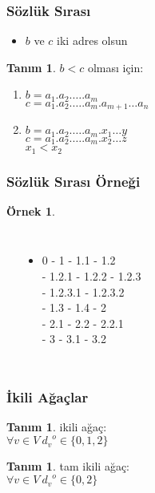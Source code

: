 \documentclass[dvipsnames]{beamer}
\theoremstyle{definition}
\newtheorem{tanim}[theorem]{Tanım}
\theoremstyle{example}
\newtheorem{ornek}[theorem]{Örnek}
\theoremstyle{plain}
\begin{document}
\begin{frame}
  \frametitle{Sözlük Sırası}

  \begin{itemize}
    \item $b$ ve $c$ iki adres olsun
  \end{itemize}

  \begin{tanim}
    \alert{$b < c$} olması için:
    \begin{enumerate}
      \item $b=a_1.a_2. \dots .a_m$\\
        $c=a_1.a_2. \dots .a_m.a_{m+1} \dots a_n$
      \pause
      \item $b=a_1.a_2. \dots .a_m.x_1 \dots y$\\
        $c=a_1.a_2. \dots .a_m.x_2 \dots z$\\
        $x_1 < x_2$
    \end{enumerate}
  \end{tanim}
\end{frame}

\begin{frame}
  \frametitle{Sözlük Sırası Örneği}

  \begin{ornek}
    \begin{columns}
      \begin{center}
      \end{center}

      \pause
      \begin{itemize}
        \item 0 - 1 - 1.1 - 1.2\\
          - 1.2.1 - 1.2.2 - 1.2.3\\
          - 1.2.3.1 - 1.2.3.2\\
          - 1.3 - 1.4 - 2\\
          - 2.1 - 2.2 - 2.2.1\\
          - 3 - 3.1 - 3.2
      \end{itemize}
    \end{columns}
  \end{ornek}
\end{frame}

\begin{frame}
  \frametitle{İkili Ağaçlar}

  \begin{tanim}
    \alert{ikili ağaç}:\\
    $\forall v \in V~{d_v}^o \in \{0,1,2\}$
  \end{tanim}

  \pause
  \begin{tanim}
    \alert{tam ikili ağaç}:\\
    $\forall v \in V~{d_v}^o \in \{0,2\}$
  \end{tanim}
\end{frame}
\end{document}
